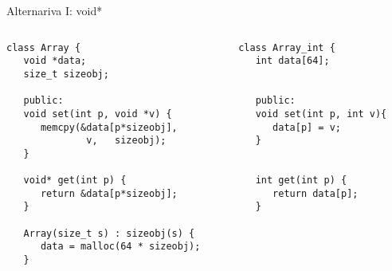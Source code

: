 \begin{frame}{Alternariva I: void*}
   \begin{columns}[t]
      \begin{column}{.55\linewidth}
         \begin{lstlisting}[style=normal,linebackgroundcolor={%
               \only<1>{\def\lst@linebgrdcmd####1####2####3{}}%
               \btLstHLB<2>{7-8}% memcpy, copia bit a bit
               \btLstHLB<3>{12}% casteo!
         }]
class Array {
   void *data;
   size_t sizeobj;

   public:
   void set(int p, void *v) {
      memcpy(&data[p*sizeobj],
              v,   sizeobj);
   }

   void* get(int p) {
      return &data[p*sizeobj];
   }

   Array(size_t s) : sizeobj(s) {
      data = malloc(64 * sizeobj);
   }
         \end{lstlisting}
      \end{column}
      \begin{column}{.40\linewidth}
         \begin{lstlisting}[style=normalnonumbers]
class Array_int {
   int data[64];


   public:
   void set(int p, int v){
      data[p] = v;
   }


   int get(int p) {
      return data[p];
   }

         \end{lstlisting}
      \end{column}
   \end{columns}
\end{frame}

